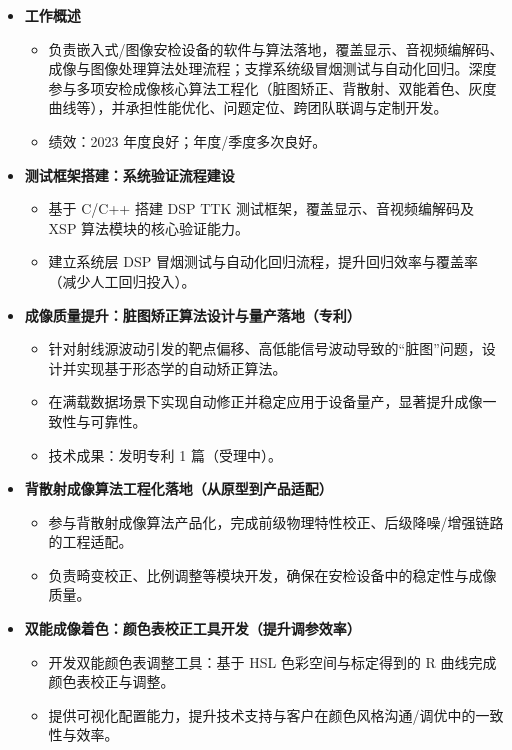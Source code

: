 \documentclass{resume}
\begin{document}
\begin{itemize}
\setlength\itemsep{0.5em}
  \item \textbf{工作概述}
  \begin{itemize}
  \small
  \setlength\itemsep{0.5em}
      \item 负责嵌入式/图像安检设备的软件与算法落地，覆盖显示、音视频编解码、成像与图像处理算法处理流程；支撑系统级冒烟测试与自动化回归。深度参与多项安检成像核心算法工程化（脏图矫正、背散射、双能着色、灰度曲线等），并承担性能优化、问题定位、跨团队联调与定制开发。
      \item 绩效：2023 年度良好；年度/季度多次良好。
  \end{itemize}

  \item \textbf{测试框架搭建：系统验证流程建设}
  \begin{itemize}
  \small
  \setlength\itemsep{0.3em}
  \item 基于 C/C++ 搭建 DSP TTK 测试框架，覆盖显示、音视频编解码及 XSP 算法模块的核心验证能力。
  \item 建立系统层 DSP 冒烟测试与自动化回归流程，提升回归效率与覆盖率（减少人工回归投入）。
  \end{itemize}

  \item \textbf{成像质量提升：脏图矫正算法设计与量产落地（专利）}
  \begin{itemize}
  \small
  \setlength\itemsep{0.3em}
  \item 针对射线源波动引发的靶点偏移、高低能信号波动导致的“脏图”问题，设计并实现基于形态学的自动矫正算法。
  \item 在满载数据场景下实现自动修正并稳定应用于设备量产，显著提升成像一致性与可靠性。
  \item 技术成果：发明专利 1 篇（受理中）。
  \end{itemize}

  \item \textbf{背散射成像算法工程化落地（从原型到产品适配）}
  \begin{itemize}
  \small
  \setlength\itemsep{0.3em}
  \item 参与背散射成像算法产品化，完成前级物理特性校正、后级降噪/增强链路的工程适配。
  \item 负责畸变校正、比例调整等模块开发，确保在安检设备中的稳定性与成像质量。
  \end{itemize}

  \item \textbf{双能成像着色：颜色表校正工具开发（提升调参效率）}
  \begin{itemize}
  \small
  \setlength\itemsep{0.3em}
  \item 开发双能颜色表调整工具：基于 HSL 色彩空间与标定得到的 R 曲线完成颜色表校正与调整。
  \item 提供可视化配置能力，提升技术支持与客户在颜色风格沟通/调优中的一致性与效率。
  \end{itemize}


\end{itemize}
\end{document}
